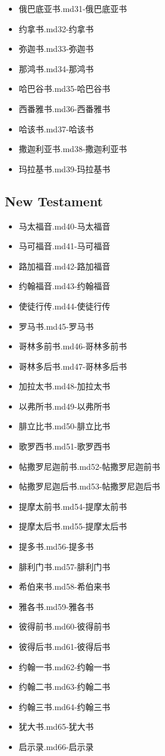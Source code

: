 \documentclass{ctexart}
\begin{document}
\begin{itemize}
  {阿摩司书.md}{30-阿摩司书}
\item
  {俄巴底亚书.md}{31-俄巴底亚书}
\item
  {约拿书.md}{32-约拿书}
\item
  {弥迦书.md}{33-弥迦书}
\item
  {那鸿书.md}{34-那鸿书}
\item
  {哈巴谷书.md}{35-哈巴谷书}
\item
  {西番雅书.md}{36-西番雅书}
\item
  {哈该书.md}{37-哈该书}
\item
  {撒迦利亚书.md}{38-撒迦利亚书}
\item
  {玛拉基书.md}{39-玛拉基书}
\end{itemize}


\subsection{New Testament}\label{header-n81}

\begin{itemize}
\item
  {马太福音.md}{40-马太福音}
\item
  {马可福音.md}{41-马可福音}
\item
  {路加福音.md}{42-路加福音}
\item
  {约翰福音.md}{43-约翰福音}
\item
  {使徒行传.md}{44-使徒行传}
\item
  {罗马书.md}{45-罗马书}
\item
  {哥林多前书.md}{46-哥林多前书}
\item
  {哥林多后书.md}{47-哥林多后书}
\item
  {加拉太书.md}{48-加拉太书}
\item
  {以弗所书.md}{49-以弗所书}
\item
  {腓立比书.md}{50-腓立比书}
\item
  {歌罗西书.md}{51-歌罗西书}
\item
  {帖撒罗尼迦前书.md}{52-帖撒罗尼迦前书}
\item
  {帖撒罗尼迦后书.md}{53-帖撒罗尼迦后书}
\item
  {提摩太前书.md}{54-提摩太前书}
\item
  {提摩太后书.md}{55-提摩太后书}
\item
  {提多书.md}{56-提多书}
\item
  {腓利门书.md}{57-腓利门书}
\item
  {希伯来书.md}{58-希伯来书}
\item
  {雅各书.md}{59-雅各书}
\item
  {彼得前书.md}{60-彼得前书}
\item
  {彼得后书.md}{61-彼得后书}
\item
  {约翰一书.md}{62-约翰一书}
\item
  {约翰二书.md}{63-约翰二书}
\item
  {约翰三书.md}{64-约翰三书}
\item
  {犹大书.md}{65-犹大书}
\item
  {启示录.md}{66-启示录}
\end{itemize}
\end{document}
